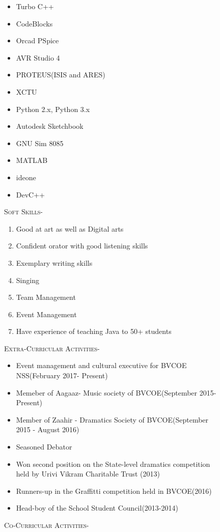 \documentclass[11pt]{article}
\begin{document}
\begin{figure}[ht]
\begin{minipage}[b]{0.45\linewidth}
\begin{small}
\begin{enumerate}
\begin{itemize}
\item  Turbo C++
\item CodeBlocks
\item  Orcad PSpice
\item AVR Studio 4
\item PROTEUS(ISIS and ARES)
\item XCTU
\item Python 2.x, Python 3.x
\item Autodesk Sketchbook
\item GNU Sim 8085
\item MATLAB
\item  ideone
\item  DevC++
\end{itemize}


\end{enumerate}
\end{small}
\end{minipage}
\hspace{0.5cm}
\begin{minipage}[b]{0.45\linewidth}
\noindent\colorbox{WeakOrange}
{\parbox{\dimexpr\textwidth-2\fboxsep\relax}{\textsc{Soft Skills-}}}

\begin{small}
\begin{enumerate}
\item Good at art as well as Digital arts
\item Confident orator with good listening skills
\item Exemplary writing skills
\item Singing
\item Team Management
\item Event Management
\item Have experience of teaching Java to 50+ students
\end{enumerate}
\end{small}
\noindent\colorbox{WeakOrange}
{\parbox{\dimexpr\textwidth-2\fboxsep\relax}{\textsc{Extra-Curricular Activities-}}}
\begin{small}
\begin{itemize}
\item Event management and cultural executive for BVCOE NSS(February 2017- Present)
\item Memeber of Aagaaz- Music society of BVCOE(September 2015- Present)
\item Member of Zaahir - Dramatics Society of BVCOE(September 2015 - August 2016)
\item Seasoned Debator
\item Won second position on the State-level dramatics competition held by Urivi Vikram Charitable Trust (2013)
\item Runners-up in the Graffitti competition held in BVCOE(2016)  
\item Head-boy of the School Student Council(2013-2014) 
\end{itemize}
\end{small}
\noindent\colorbox{WeakOrange}
{\parbox{\dimexpr\textwidth-2\fboxsep\relax}{\textsc{Co-Curricular Activities-}}}


\end{minipage}
\end{figure}
\end{document}
